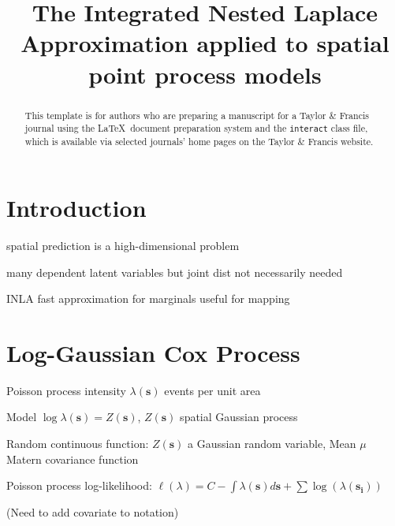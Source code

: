 \documentclass[]{interact}
\begin{document}

\title{The Integrated Nested Laplace Approximation applied to spatial point process models}

\author{
}

\maketitle

\begin{abstract}
This template is for authors who are preparing a manuscript for a Taylor \& Francis journal using the \LaTeX\ document preparation system and the \texttt{interact} class file, which is available via selected journals' home pages on the Taylor \& Francis website.
\end{abstract}

\begin{keywords}
\end{keywords}


\section{Introduction}

spatial prediction is a high-dimensional problem

many dependent latent variables but joint dist not necessarily needed

INLA fast approximation for marginals useful for mapping \cite{rueetal}


\section{Log-Gaussian Cox Process}

Poisson process intensity $\lambda(\mathbf{s})$ events per unit area

Model $\log\lambda(\mathbf{s}) = Z(\mathbf{s})$, $Z(\mathbf{s})$ spatial Gaussian process

Random continuous function: $Z(\mathbf{s})$ a Gaussian random variable, Mean $\mu$ Matern covariance function

Poisson process log-likelihood: $\ell(\lambda) = C - \int \lambda(\mathbf{s}) d\mathbf{s} + \sum \log(\lambda(\mathbf{s_{i}}))$

(Need to add covariate to notation)
\end{document}
